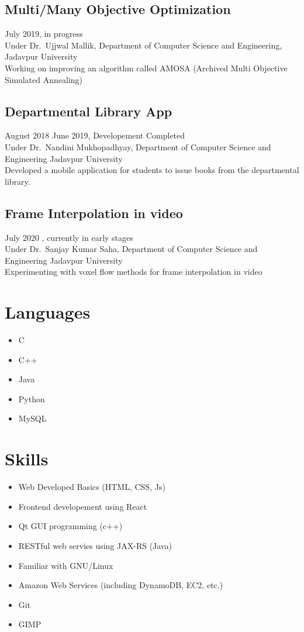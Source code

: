 \documentclass{article}
\begin{document}
\subsection{Multi/Many Objective Optimization}
July 2019, in progress\\
Under Dr.\ Ujjwal Mallik, 
Department of Computer Science and Engineering, 
Jadavpur University\\

Working on improving an algorithm called AMOSA
(Archived Multi Objective Simulated Annealing)

\subsection{Departmental Library App}
August 2018 \- June 2019, Developement Completed\\
Under Dr.\ Nandini Mukhopadhyay,
Department of Computer Science and Engineering
Jadavpur University\\

Developed a mobile application for students to issue books from
the departmental library.

\subsection{Frame Interpolation in video}
July 2020 , currently in early stages\\
Under Dr.\ Sanjay Kumar Saha,
Department of Computer Science and Engineering
Jadavpur University\\

Experimenting with voxel flow methods for frame interpolation in video


\section{Languages} 
\begin{itemize}
	\item C
	\item C++
	\item Java
	\item Python
	\item MySQL
\end{itemize}

\section{Skills} 
\begin{itemize}
	\item Web Developed Basics (HTML, CSS, Js)
	\item Frontend developement using React
	\item Qt GUI programming (c++)
	\item RESTful web servies using JAX-RS (Java)
	\item Familiar with GNU/Linux 
	\item Amazon Web Services (including DynamoDB, EC2, etc.)
	\item Git
	\item GIMP
\end{itemize}
\end{document}
